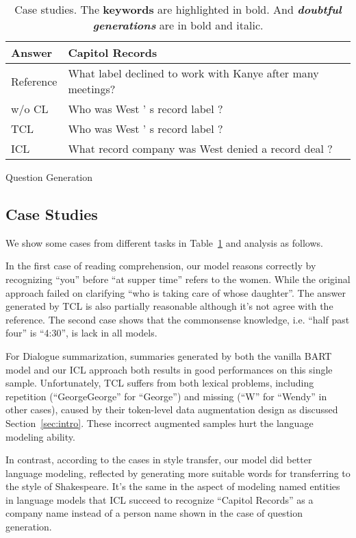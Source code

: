 \begin{table}[th!]
\begin{subtable}{\linewidth}
\begin{tabular}{p{1cm}p{5.8cm}}
			\hline	
			Answer & Capitol Records\\
			\hline
			{Reference} & What label declined to work with Kanye after many meetings?\\
			\hline
			w/o CL & Who was West ' s record label ?\\
			\hline
			TCL & Who was West ' s record label ?\\
			\hline
			ICL & What record company was West denied a record deal ? \\
			\bottomrule[1pt]
		\end{tabular}
		\caption{Question Generation}
		\label{tab:caseqg}
	\end{subtable}
	\caption{Case studies. 
The \textbf{keywords} are highlighted in bold. And \textbf{\textit{doubtful generations}} are in bold and italic.}
	\label{tab:cases}
\end{table}

 
\subsection{Case Studies}

We show some cases from different tasks in Table~\ref{tab:cases} and analysis as follows.

In the first case of reading comprehension, our model reasons correctly by recognizing ``you'' before ``at supper time'' refers to the women. While the original approach failed on clarifying ``who is taking care of whose daughter''. The answer generated by TCL is also partially reasonable although it's not agree with the reference. The second case shows that the commonsense knowledge, i.e. ``half past four'' is ``4:30'', is lack in all models.

For Dialogue summarization, summaries generated by both the vanilla BART model and our ICL approach both results in good performances on this single sample. Unfortunately, TCL suffers from both lexical problems, including repetition (``GeorgeGeorge'' for ``George'') and missing (``W'' for ``Wendy'' in other cases), caused by their token-level data augmentation design as discussed Section~\ref{sec:intro}. These incorrect augmented samples hurt the language modeling ability.

In contrast, according to the cases in style transfer, our model did better language modeling, reflected by generating more suitable words for transferring to the style of Shakespeare. 
It's the same in the aspect of modeling named entities in language models that ICL succeed to recognize ``Capitol Records'' as a company name instead of a person name shown in the case of question generation.


